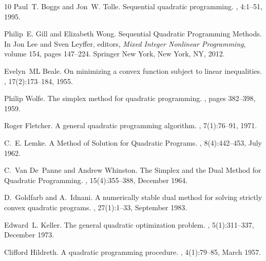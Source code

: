 \documentclass{article}
\begin{document}
\begin{thebibliography}{10}
		Paul~T. Boggs and Jon~W. Tolle.
		\newblock Sequential quadratic programming.
		, 4:1--51, 1995.
		
		Philip~E. Gill and Elizabeth Wong.
		\newblock Sequential {{Quadratic Programming Methods}}.
		\newblock In Jon Lee and Sven Leyffer, editors, {\em Mixed {{Integer Nonlinear
					Programming}}}, volume 154, pages 147--224. Springer New York, New York, NY,
		2012.
		
		Evelyn~ML Beale.
		\newblock On minimizing a convex function subject to linear inequalities.
		, 17(2):173--184, 1955.
		
		Philip Wolfe.
		\newblock The simplex method for quadratic programming.
		, pages
		382--398, 1959.
		
		Roger Fletcher.
		\newblock A general quadratic programming algorithm.
		, 7(1):76--91, 1971.
		
		C.~E. Lemke.
		\newblock A {{Method}} of {{Solution}} for {{Quadratic Programs}}.
		, 8(4):442--453, July 1962.
		
		C.~Van De~Panne and Andrew Whinston.
		\newblock The {{Simplex}} and the {{Dual Method}} for {{Quadratic
				Programming}}.
		, 15(4):355--388,
		December 1964.
		
		D.~Goldfarb and A.~Idnani.
		\newblock A numerically stable dual method for solving strictly convex
		quadratic programs.
		, 27(1):1--33, September 1983.
		
		Edward~L. Keller.
		\newblock The general quadratic optimization problem.
		, 5(1):311--337, December 1973.
		
		Clifford Hildreth.
		\newblock A quadratic programming procedure.
		, 4(1):79--85, March 1957.
		

\end{thebibliography}
\end{document}

